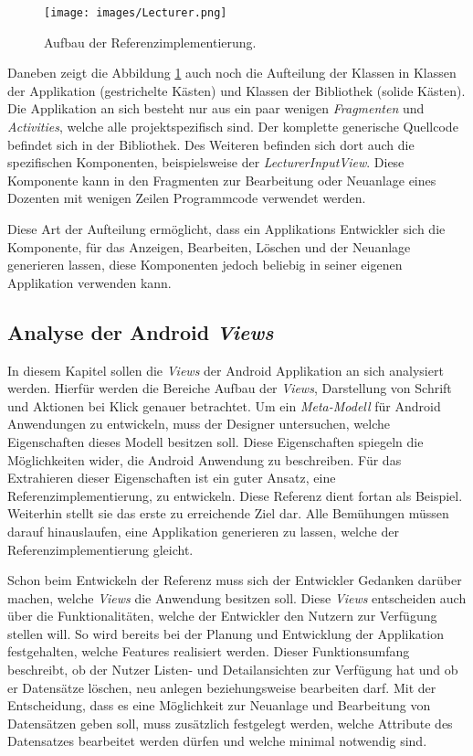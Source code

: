 \begin{figure}[H]
	\begin{center}
		\texttt{[image: images/Lecturer.png]}
		\caption{Aufbau der Referenzimplementierung.}
		\label{fig:lecturer_structure}
	\end{center}
\end{figure}

Daneben zeigt die Abbildung \ref{fig:lecturer_structure} auch noch die Aufteilung der Klassen in Klassen der Applikation (gestrichelte Kästen) und Klassen der Bibliothek (solide Kästen). Die Applikation an sich besteht nur aus ein paar wenigen \textit{Fragmenten} und \textit{Activities}, welche alle projektspezifisch sind. Der komplette generische Quellcode befindet sich in der Bibliothek. Des Weiteren befinden sich dort auch die spezifischen Komponenten, beispielsweise der \textit{LecturerInputView}. Diese Komponente kann in den Fragmenten zur Bearbeitung oder Neuanlage eines Dozenten mit wenigen Zeilen Programmcode verwendet werden.

Diese Art der Aufteilung ermöglicht, dass ein Applikations Entwickler sich die Komponente, für das Anzeigen, Bearbeiten, Löschen und der Neuanlage generieren lassen, diese Komponenten jedoch beliebig in seiner eigenen Applikation verwenden kann.


\subsection{Analyse der Android \textit{Views}}
In diesem Kapitel sollen die \textit{Views} der Android Applikation an sich analysiert werden. Hierfür werden die Bereiche Aufbau der \textit{Views}, Darstellung von Schrift und Aktionen bei Klick genauer betrachtet. Um ein \textit{Meta-Modell} für Android Anwendungen zu entwickeln, muss der Designer untersuchen, welche Eigenschaften dieses Modell besitzen soll. Diese Eigenschaften spiegeln die Möglichkeiten wider, die Android Anwendung zu beschreiben. Für das Extrahieren dieser Eigenschaften ist ein guter Ansatz, eine Referenzimplementierung, zu entwickeln. Diese Referenz dient fortan als Beispiel. Weiterhin stellt sie das erste zu erreichende Ziel dar. Alle Bemühungen müssen darauf hinauslaufen, eine Applikation generieren zu lassen, welche der Referenzimplementierung gleicht.

Schon beim Entwickeln der Referenz muss sich der Entwickler Gedanken darüber machen, welche \textit{Views} die Anwendung besitzen soll. Diese \textit{Views} entscheiden auch über die Funktionalitäten, welche der Entwickler den Nutzern zur Verfügung stellen will. So wird bereits bei der Planung und Entwicklung der Applikation festgehalten, welche Features realisiert werden. Dieser Funktionsumfang beschreibt, ob der Nutzer Listen- und Detailansichten zur Verfügung hat und ob er Datensätze löschen, neu anlegen beziehungsweise bearbeiten darf. Mit der Entscheidung, dass es eine Möglichkeit zur Neuanlage und Bearbeitung von Datensätzen geben soll, muss zusätzlich festgelegt werden, welche Attribute des Datensatzes bearbeitet werden dürfen und welche minimal notwendig sind.


